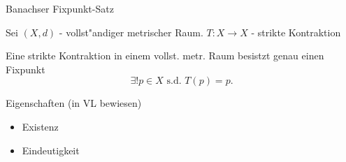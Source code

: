 \documentclass[class=article, crop=false]{standalone}
\begin{document}
\begin{zettel}{Banachser Fixpunkt-Satz}
\begin{flashcard}
    Sei $ (X,d) $  - vollst"andiger metrischer Raum. $T: X \longrightarrow X$ - strikte Kontraktion 
    
    \begin{theorem}
        Eine strikte Kontraktion in einem vollst. metr. Raum besistzt genau einen Fixpunkt
        \[
            \exists ! p \in  X \text{ s.d. } T(p)  = p
        .\]
    \end{theorem}
\end{flashcard}
\begin{remark}
    Eigenschaften (in VL bewiesen)
    \begin{itemize}
        \item Existenz
        \item Eindeutigkeit
    \end{itemize}
    
\end{remark}
\end{zettel}
\end{document}

